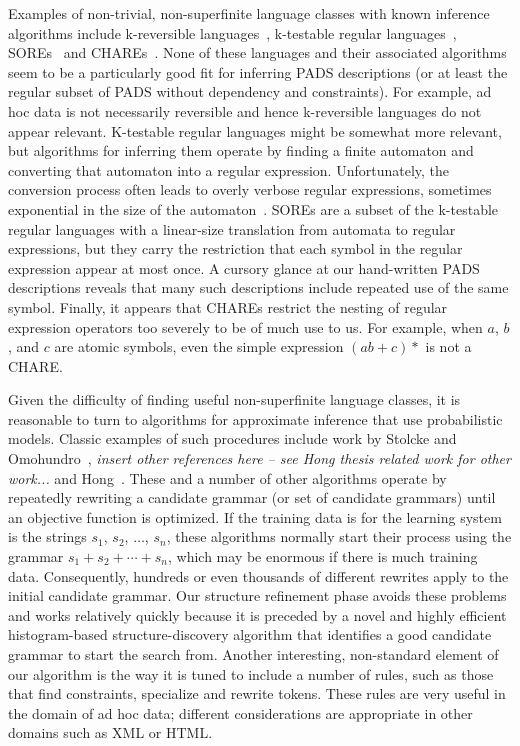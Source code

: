 Examples of non-trivial, non-superfinite
language classes with known inference algorithms include
k-reversible languages~\cite{angluin:revesible-language-inference},
k-testable regular languages~\cite{garcia+:k-testable-languages},
SOREs~\cite{bex+:dtd-inference} and CHAREs~\cite{bex+:dtd-inference}.
None of these languages and their associated algorithms seem to be 
a particularly good fit for inferring PADS descriptions (or at least the
regular subset of PADS without dependency and constraints).  
For example, ad hoc data
is not necessarily reversible and hence k-reversible languages
do not appear relevant.  K-testable regular languages might be somewhat
more relevant, but algorithms for inferring them
operate by finding a finite automaton and converting that 
automaton into a regular expression.  Unfortunately, the conversion process
often leads to overly verbose regular expressions, sometimes 
exponential in the size of the automaton~\cite{bex+:dtd-inference}. 
SOREs are a subset of the k-testable
regular languages with a linear-size translation from automata to
regular expressions, but they carry the restriction that each symbol
in the regular expression appear at most once.  A cursory glance at
our hand-written PADS descriptions reveals that many such descriptions
include repeated use of the same symbol.  Finally, it appears that
CHAREs restrict the nesting of regular expression operators too severely to 
be of much use to us.  For example, when $a$, $b$, and $c$ are atomic symbols,
even the simple expression $(ab + c)*$ is not a CHARE.

Given the difficulty of finding useful non-superfinite language classes,
it is reasonable to turn to algorithms for approximate
inference that use probabilistic models.    
Classic examples of such procedures include work by Stolcke and
Omohundro~\cite{stolcke94inducing}, {\em insert other references here -- see Hong thesis related work for other work...} and 
Hong~\cite{hong01using,hong:thesis}.  These and a number of other algorithms
operate by repeatedly rewriting a candidate grammar (or set of candidate
grammars) until an objective function is optimized.
If the training data is for the learning system is the strings
$s_1$, $s_2$, $\ldots$, $s_n$, these algorithms normally start their
process using the grammar $s_1 + s_2 + \cdots + s_n$, which may
be enormous if there is much training data.  
Consequently, hundreds or even thousands of different rewrites apply to the
initial candidate grammar.  Our structure refinement
phase avoids these problems and works relatively quickly 
because it is preceded by a novel and highly efficient
histogram-based structure-discovery algorithm 
that identifies a good candidate grammar to start the search from.  
Another interesting, non-standard element of our algorithm is the way 
it is tuned to include a number of
rules, such as those that find constraints, specialize and rewrite tokens.
These rules are very useful in the domain of ad hoc data; different
considerations are appropriate in other domains such as XML or HTML.

